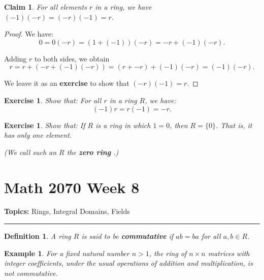\documentclass[a4paper,12pt]{report}
\newcounter{statement}
\numberwithin{statement}{chapter}
\newtheorem{defn}[statement]{Definition}
\newtheorem{claim}[statement]{Claim}
\newtheorem{eg}[statement]{\bf Example}
\newtheorem{ex}[statement]{\bf Exercise}
\numberwithin{equation}{chapter}
\numberwithin{section}{chapter}
\numberwithin{subsection}{section}
\begin{document}
\begin{claim}

For all elements $r$ in a ring, we have $(-1)(-r) = (-r)(-1)= r$.
\end{claim}
\begin{proof}

We have:
\[
0 = 0(-r) = (1 + (-1))(-r) = -r + (-1)(-r).
\]

Adding $r$ to both sides, we obtain
\[
r = r + (-r + (-1)(-r)) = (r + -r) + (-1)(-r) = (-1)(-r).
\]

We leave it as an  {\bf exercise}  to show that $(-r)(-1) = r$.


\end{proof}







\begin{ex}
Show that:
For all $r$ in a ring $R$, we have:
\[
(-1) r = r(-1) = -r.
\]
\end{ex}



\begin{ex}

Show that:
If $R$ is a ring in which $1 = 0$, then $R = \{0\}$.  That is, it has only one element.

(We call such an $R$ the  {\bf zero ring} .)

\end{ex}
\setcounter{chapter}{8}\setcounter{section}{0}
\setcounter{subsection}{0}
\setcounter{statement}{0}

\chapter*{Math 2070 Week 8}
{\bf Topics: }Rings, Integral Domains, Fields
\hrule








\begin{defn}
A ring $R$ is said to be  {\bf commutative}  if $ab = ba$ for all $a, b \in R$.
\end{defn}



\begin{eg}

For a fixed natural number $n > 1$,
the ring of $n\times n$ matrices with integer coefficients,
under the usual operations of addition and multiplication, is not commutative.

\end{eg}
\end{document}
